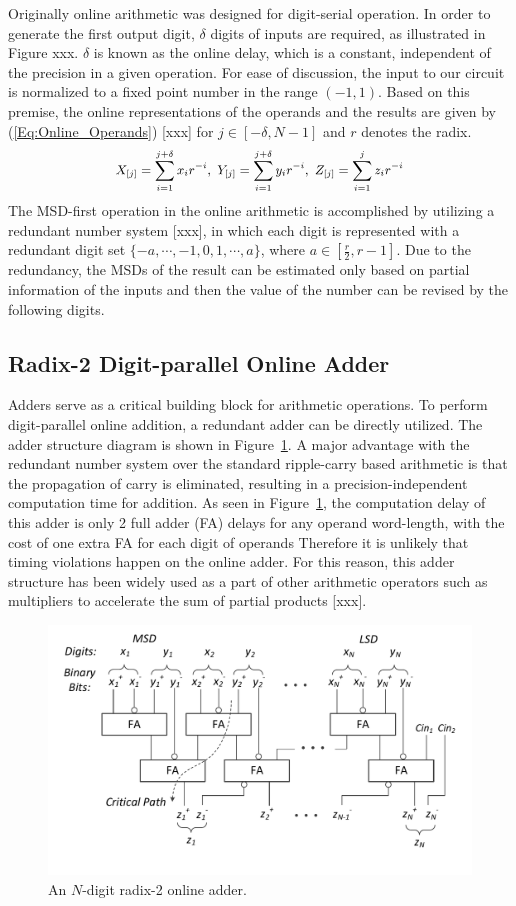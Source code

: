\documentclass{acm_proc_article-sp}
\begin{document}
Originally online arithmetic was designed for digit-serial operation. In order to generate the first output digit, $\delta$ digits of inputs are required, as illustrated in Figure xxx. $\delta$ is known as the online delay, which is a constant, independent of the precision in a given operation. For ease of discussion, the input to our circuit is normalized to a fixed point number in the range $(-1,1)$. Based on this premise, the online representations of the operands and the results are given by (\ref{Eq:Online_Operands}) [xxx] for $j\in[-\delta,N-1]$ and $r$ denotes the radix.
%
\begin{eqnarray}\label{Eq:Online_Operands}
\footnotesize
  X_{[j]}=\sum_{i=1}^{j+\delta}x_ir^{-i},~Y_{[j]}=\sum_{i=1}^{j+\delta}y_ir^{-i},~Z_{[j]}=\sum_{i=1}^{j}z_ir^{-i}
\normalsize
\end{eqnarray}
%
The MSD-first operation in the online arithmetic is accomplished by utilizing a redundant number system [xxx], in which each digit is represented with a redundant digit set $\{-a,\cdots,-1,0,1,\cdots,a\}$, where $a\in[\frac{r}{2},r-1]$. Due to the redundancy, the MSDs of the result can be estimated only based on partial information of the inputs and then the value of the number can be revised by the following digits.

\subsection{Radix-2 Digit-parallel Online Adder}
Adders serve as a critical building block for arithmetic operations. To perform digit-parallel online addition, a redundant adder can be directly utilized. The adder structure diagram is shown in Figure~\ref{Fig:Radix2SD_adder}. A major advantage with the redundant number system over the standard ripple-carry based arithmetic is that the propagation of carry is eliminated, resulting in a precision-independent computation time for addition. As seen in Figure~\ref{Fig:Radix2SD_adder}, the computation delay of this adder is only 2 full adder (FA) delays for any operand word-length, with the cost of one extra FA for each digit of operands Therefore it is unlikely that timing violations happen on the online adder. For this reason, this adder structure has been widely used as a part of other arithmetic operators such as multipliers to accelerate the sum of partial products [xxx].
%
\begin{figure}
\includegraphics[width=.5\textwidth]{./Figures/SDAdder.pdf}
\vspace{-6.5ex}
\caption{An $N$-digit radix-2 online adder.}
\label{Fig:Radix2SD_adder}
\end{figure}
\end{document}
